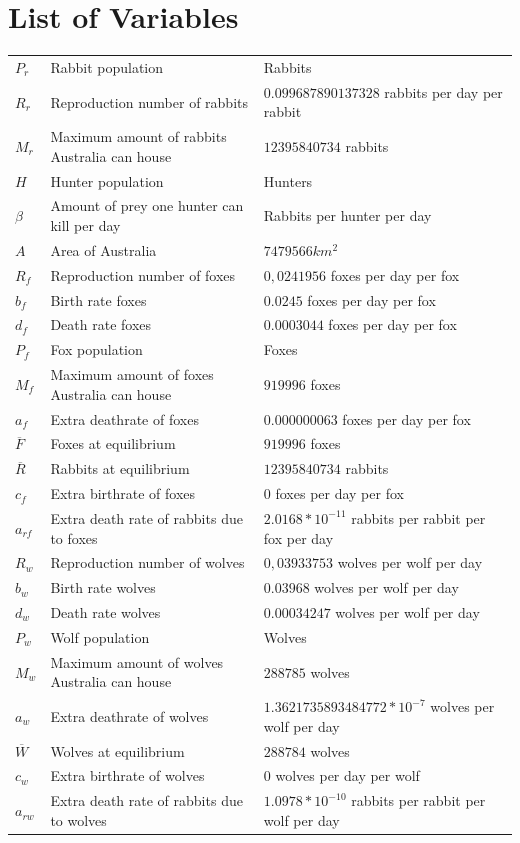 \documentclass{article}
\begin{document}
\section*{List of Variables}
\begin{table}[h!]
\begin{tabular}{lll}
 $P_r$&Rabbit population&Rabbits\\
 $R_r$&Reproduction number of rabbits&$0.099687890137328$ rabbits per day per rabbit\\
 $M_r$&Maximum amount of rabbits Australia can house&$12395840734$ rabbits\\
 $H$&Hunter population&Hunters\\
 $\beta$&Amount of prey one hunter can kill per day&Rabbits per hunter per day\\
 $A$&Area of Australia&$7 479 566 km^2$\\
 $R_f$&Reproduction number of foxes&$0,0241956$ foxes per day per fox\\
 $b_f$&Birth rate foxes&$0.0245$ foxes per day per fox\\
 $d_f$&Death rate foxes&$0.0003044$ foxes per day per fox\\
 $P_f$&Fox population&Foxes\\
 $M_f$&Maximum amount of foxes Australia can house&$919996$ foxes\\
 $a_f$&Extra deathrate of foxes&$0.000000063$ foxes per day per fox\\
 $\overline{F}$&Foxes at equilibrium&$919996$ foxes\\
 $\overline{R}$&Rabbits at equilibrium&$12395840734$ rabbits\\
 $c_f$&Extra birthrate of foxes&$0$ foxes per day per fox\\
 $a_{rf}$&Extra death rate of rabbits due to foxes&$2.0168*10^{-11}$ rabbits per rabbit per fox per day\\
 $R_w$&Reproduction number of wolves&$0,03933753$ wolves per wolf per day\\
 $b_w$&Birth rate wolves&$0.03968$ wolves per wolf per day\\
 $d_w$&Death rate wolves&$0.00034247$ wolves per wolf per day\\
 $P_w$&Wolf population&Wolves\\
 $M_w$&Maximum amount of wolves Australia can house&$288785$ wolves\\
 $a_w$&Extra deathrate of wolves&$1.3621735893484772*10^{-7}$ wolves per wolf per day\\
 $\overline{W}$&Wolves at equilibrium&$288784$ wolves\\
 $c_w$&Extra birthrate of wolves&$0$ wolves per day per wolf\\
 $a_{rw}$&Extra death rate of rabbits due to wolves&$1.0978*10^{-10}$ rabbits per rabbit per wolf per day
\end{tabular}
\end{table}
\end{document}
